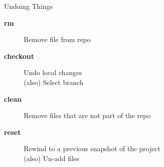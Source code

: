 \documentclass[aspectratio=169]{beamer}
\begin{document}



\begin{frame}{Undoing Things}\small
  \begin{description}
    \item[\bf rm] Remove file from repo \\[5ex]
    \item[\bf checkout] Undo local changes
    \\[1.5ex]
    (also) Select branch\\[5ex]
    \item[\bf clean] Remove files that are not part of the repo
    \\[5ex]
    \item[\bf reset] Rewind to a previous snapshot of the project \\[1.5ex]
    (also) Un-add files\\
  \end{description}
\end{frame}



\end{document}
